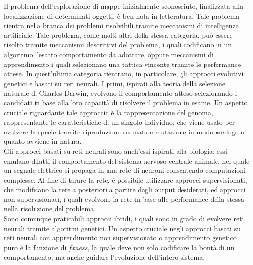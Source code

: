 Il problema dell'esplorazione di mappe inizialmente sconosciute, finalizzata alla
localizzazione di determinati oggetti, è ben nota in letteratura. Tale problema
rientra nella branca dei problemi risolvibili tramite meccanismi di intelligenza
artificiale. Tale problema, come molti altri della stessa categoria, può essere
risolto tramite meccanismi descrittivi del problema, i quali codificano in un
algoritmo l'esatto comportamento da adottare, oppure meccanismi di apprendimento
i quali selezionano una tattica vincente tramite le performance attese. In
quest'ultima categoria rientrano, in particolare, gli approcci evolutivi genetici
e basati su reti neurali. I primi, ispirati alla teoria della selezione naturale
di Charles Darwin, evolvono il comportamento atteso selezionando i candidati in
base alla loro capacità di risolvere il problema in esame. Un aspetto cruciale
riguardante tale approccio è la rappresentazione del genoma, rappresentante le
caratteristiche di un singolo individuo, che viene usato per evolvere la specie
tramite riproduzione sessuata e mutazione in modo analogo a quanto avviene in
natura.\\

Gli approcci basati su reti neurali sono anch'essi ispirati alla biologia:
essi emulano difatti il comportamento del sistema nervoso centrale animale, nel
quale un segnale elettrico si propaga in una rete di neuroni
consentendo computazioni complesse. Al fine di tarare la rete, è possibile
utilizzare approcci supervisionati, che modificano la rete a posteriori a
partire dagli output desiderati, ed approcci non supervisionati, i quali
evolvono la rete in base alle performance della stessa nella risoluzione del
problema.\\

Sono comunque praticabili approcci ibridi, i quali sono in grado di evolvere
reti neurali tramite algoritmi genetici. Un aspetto cruciale negli approcci
basati su reti neurali con apprendimento non supervisionato o
apprendimento genetico puro è la funzione di \emph{fitness}, la quale deve non
solo codificare la bontà di un comportamento, ma anche guidare l'evoluzione
dell'intero sistema.
